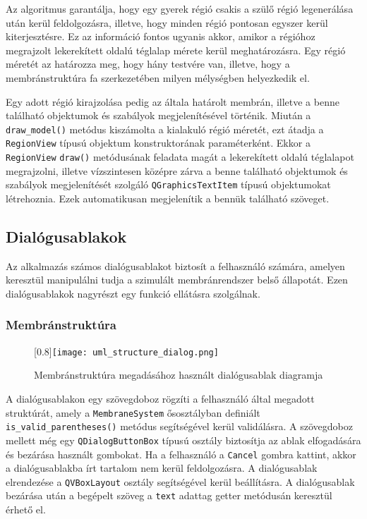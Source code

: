 Az algoritmus garantálja, hogy egy gyerek régió csakis a szülő régió legenerálása után kerül feldolgozásra, illetve, hogy minden régió pontosan egyszer kerül kiterjesztésre. Ez az információ fontos ugyanis akkor, amikor a régióhoz megrajzolt lekerekített oldalú téglalap mérete kerül meghatározásra.  Egy régió méretét az határozza meg, hogy hány testvére van, illetve, hogy a membránstruktúra fa szerkezetében milyen mélységben helyezkedik el.

Egy adott régió kirajzolása pedig az általa határolt membrán, illetve a benne található objektumok és szabályok megjelenítésével történik. Miután a \verb|draw_model()| metódus kiszámolta a kialakuló régió méretét, ezt átadja a \verb|RegionView| típusú objektum konstruktorának paraméterként. Ekkor a \verb|RegionView| \verb|draw()| metódusának feladata magát a lekerekített oldalú téglalapot megrajzolni, illetve vízszintesen középre zárva a benne található objektumok és szabályok megjelenítését szolgáló \verb|QGraphicsTextItem| típusú objektumokat létrehoznia. Ezek automatikusan megjelenítik a bennük található szöveget.

\subsection{Dialógusablakok}

Az alkalmazás számos dialógusablakot biztosít a felhasználó számára, amelyen keresztül manipulálni tudja a szimulált membránrendszer belső állapotát. Ezen dialógusablakok nagyrészt egy funkció ellátásra szolgálnak.

\subsubsection{Membránstruktúra}

\begin{figure}[H]
\centering
	\scalebox{0.8}[0.8]{\texttt{[image: uml\_structure\_dialog.png]}}
	\caption{Membránstruktúra megadásához használt dialógusablak diagramja}
	\label{fig:uml_structure}
\end{figure}

A dialógusablakon egy szövegdoboz rögzíti a felhasználó által megadott struktúrát, amely a \verb|MembraneSystem| ősosztályban definiált \verb|is_valid_parentheses()| metódus segítségével kerül validálásra. A szövegdoboz mellett még egy \verb|QDialogButtonBox| típusú osztály biztosítja az ablak elfogadására és bezárása használt gombokat. Ha a felhasználó a \verb|Cancel| gombra kattint, akkor a dialógusablakba írt tartalom nem kerül feldolgozásra. A dialógusablak elrendezése a \verb|QVBoxLayout| osztály segítségével kerül beállításra. A dialógusablak bezárása után a begépelt szöveg a \verb|text| adattag getter metódusán keresztül érhető el.


